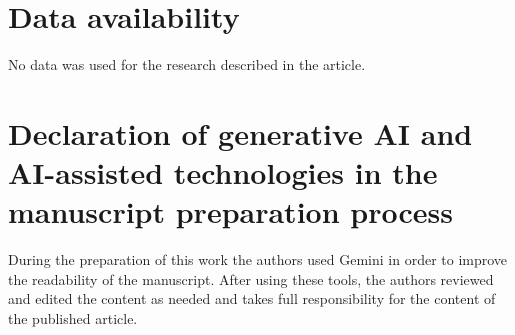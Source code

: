 \documentclass[11pt, amsfonts]{amsart}
\numberwithin{equation}{section}
\theoremstyle{definition}
\theoremstyle{remark}
\begin{document}
\section*{Data availability}
No data was used for the research described in the article.

\section*{Declaration of generative AI and AI-assisted technologies in the manuscript preparation process}

During the preparation of this work the authors used Gemini in order to improve the readability of the manuscript. After using these tools, the authors reviewed and edited the content as needed and takes full responsibility for the content of the published article.
\end{document}
